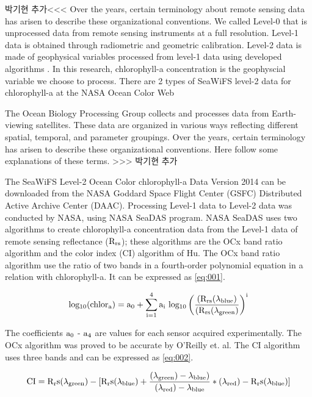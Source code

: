 박기현 추가<<<
Over the years, certain terminology about remote sensing data has arisen to describe these organizational conventions. We called Level-0 that is unprocessed data from remote sensing instruments at a full resolution. Level-1 data is obtained through radiometric and geometric calibration. Level-2 data is made of geophysical variables processed from level-1 data using developed algorithms \cite{feldman2017ocean}. 
In this research, chlorophyll-a concentration is the geophyscial variable we choose to process. There are 2 types of SeaWiFS level-2 data for chlorophyll-a at the NASA Ocean Color Web

 The Ocean Biology Processing Group collects and processes data from Earth-viewing satellites. These data are organized in various ways reflecting different spatial, temporal, and parameter groupings. Over the years, certain terminology has arisen to describe these organizational conventions. Here follow some explanations of these terms.
>>> 박기현 추가
 
The SeaWiFS Level-2 Ocean Color chlorophyll-a Data Version 2014 can be downloaded from the NASA Goddard Space Flight Center (GSFC) Distributed Active Archive Center (DAAC). Processing Level-1 data to Level-2 data was conducted by NASA, using NASA SeaDAS program\cite{NASASeaFiWSdata}. NASA SeaDAS uses two algorithms to create chlorophyll-a concentration data from the Level-1 data of remote sensing reflectance ($\rm R_{rs}$); these algorithms are the OCx band ratio algorithm and the color index (CI) algorithm of Hu. 
 The OCx band ratio algorithm use the ratio of two bands in a fourth-order polynomial equation in a relation with chlorophyll-a. It can be expressed as \eqref{eq:001}.
 
 \begin{equation}
 {\rm log_{10} (chlor_a) = a_0 + \sum_{i=1}^4 a_i ~ log_{10} \left( \frac{(R_{rs}(\lambda_{blue})}{(R_{rs}(\lambda_{green})} \right) ^i }
 \label{eq:001}
 \end{equation}
 
The coefficients $\rm a_0$ - $\rm a_4$ are values for each sensor acquired experimentally. The OCx algorithm was proved to be accurate by O’Reilly et. al\cite{o2000ocean}. The CI algorithm uses three bands and can be expressed as \eqref{eq:002}.

 \begin{equation}
{\rm CI = R_rs ({\lambda}_{green}) - [R_rs ({\lambda}_{blue}) + \frac {({\lambda}_{green}) - {\lambda}_{blue})} {({\lambda}_{red}) - {\lambda}_{blue}} * ({\lambda}_{red}) - R_rs ({\lambda}_{blue}) ]}
\label{eq:002}
\end{equation}

